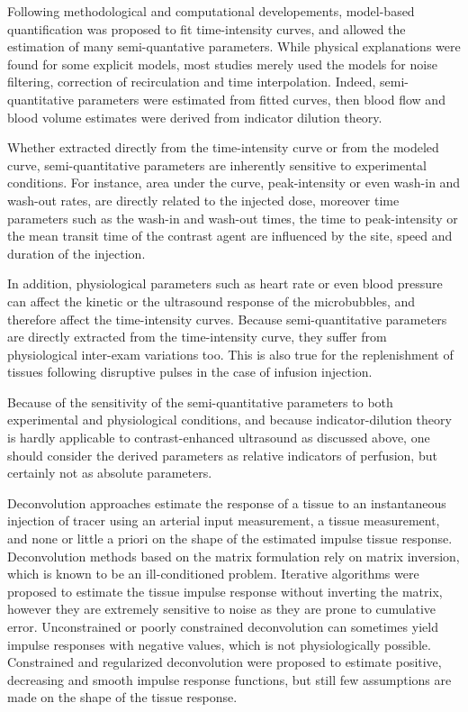 Following methodological and computational developements, model-based quantification was proposed to fit time-intensity curves, and allowed the estimation of many semi-quantative parameters. 
While physical explanations were found for some explicit models, most studies merely used the models for noise filtering, correction of recirculation and time interpolation.
Indeed, semi-quantitative parameters were estimated from fitted curves, then blood flow and blood volume estimates were derived from indicator dilution theory.

Whether extracted directly from the time-intensity curve or from the modeled curve, semi-quantitative parameters are inherently sensitive to experimental conditions.
For instance, area under the curve, peak-intensity or even wash-in and wash-out rates, are directly related to the injected dose, moreover time parameters such as the wash-in and wash-out times, the time to peak-intensity or the mean transit time of the contrast agent are influenced by the site, speed and duration of the injection.

In addition, physiological parameters such as heart rate or even blood pressure can affect the kinetic or the ultrasound response of the microbubbles, and therefore affect the time-intensity curves. 
Because semi-quantitative parameters are directly extracted from the time-intensity curve, they suffer from physiological inter-exam variations too. 
This is also true for the replenishment of tissues following disruptive pulses in the case of infusion injection.

Because of the sensitivity of the semi-quantitative parameters to both experimental and physiological conditions, and because indicator-dilution theory is hardly applicable to contrast-enhanced ultrasound as discussed above, one should consider the derived parameters as relative indicators of perfusion, but certainly not as absolute parameters.

Deconvolution approaches estimate the response of a tissue to an instantaneous injection of tracer using an arterial input measurement, a tissue measurement, and none or little a priori on the shape of the estimated impulse tissue response.
Deconvolution methods based on the matrix formulation rely on matrix inversion, which is known to be an ill-conditioned problem.
Iterative algorithms were proposed to estimate the tissue impulse response without inverting the matrix, however they are extremely sensitive to noise as they are prone to cumulative error.
Unconstrained or poorly constrained deconvolution can sometimes yield impulse responses with negative values, which is not physiologically possible.
Constrained and regularized deconvolution were proposed to estimate positive, decreasing and smooth impulse response functions, but still few assumptions are made on the shape of the tissue response.

